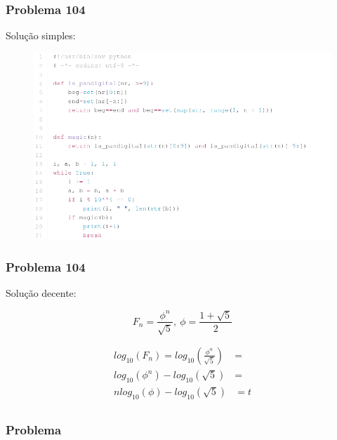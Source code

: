 \documentclass{beamer}
\begin{document}
\begin{frame}
    \frametitle{Problema 104}

    Solução simples:

    \begin{figure}[htpb]
        \centering
        \includegraphics[width=0.8\linewidth]{images/prob104.png}
    \end{figure}
\end{frame}

\begin{frame}
    \frametitle{Problema 104}

    Solução decente:

    \begin{equation}
        F_n = \frac{\phi^n}{\sqrt{5}},\: \phi = \frac{1+\sqrt{5}}{2}
    \end{equation}

    \begin{align}
        log_{10}(F_n) = log_{10}(\frac{\phi^n}{\sqrt{5}}) &= \\
        log_{10}(\phi^n) - log_{10}(\sqrt{5}) &=   \\
        n log_{10}(\phi) - log_{10}(\sqrt{5}) &= t \\
    \end{align}
\end{frame}




\begin{frame}
    \frametitle{Problema }

    \begin{center}
        \textit{
        }
    \end{center}
\end{frame}
\end{document}
